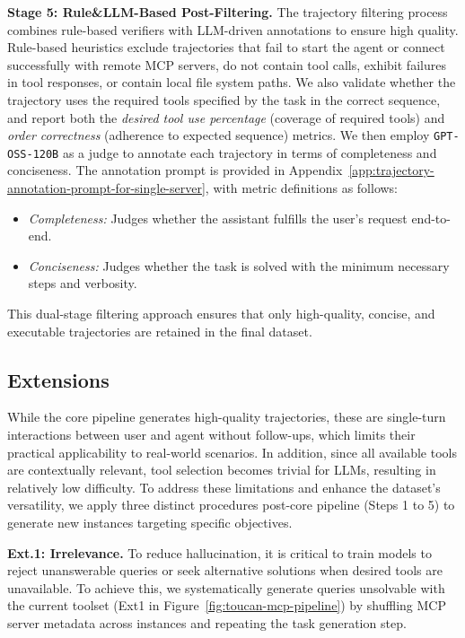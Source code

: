\textbf{\textcolor{orange!90!black}{Stage 5: Rule\&LLM-Based Post-Filtering.}}
The trajectory filtering process combines rule-based verifiers with LLM-driven annotations to ensure high quality. Rule-based heuristics exclude trajectories that fail to start the agent or connect successfully with remote MCP servers, do not contain tool calls, exhibit failures in tool responses, or contain local file system paths. We also validate whether the trajectory uses the required tools specified by the task in the correct sequence, and report both the \textit{desired tool use percentage} (coverage of required tools) and \textit{order correctness} (adherence to expected sequence) metrics. We then employ \texttt{GPT-OSS-120B} as a judge to annotate each trajectory in terms of completeness and conciseness. The annotation prompt is provided in Appendix~\ref{app:trajectory-annotation-prompt-for-single-server}, with metric definitions as follows:
\begin{itemize}[itemsep=0pt, parsep=0pt, topsep=0pt, leftmargin=1em]
\item \textit{Completeness:} Judges whether the assistant fulfills the user's request end-to-end.
\item \textit{Conciseness:} Judges whether the task is solved with the minimum necessary steps and verbosity.
\end{itemize}
This dual-stage filtering approach ensures that only high-quality, concise, and executable trajectories are retained in the final dataset.

\subsection{\dataname Extensions}\label{sec:toucan-extensions}

While the core pipeline generates high-quality trajectories, these are single-turn interactions between user and agent without follow-ups, which limits their practical applicability to real-world scenarios. In addition, since all available tools are contextually relevant, tool selection becomes trivial for LLMs, resulting in relatively low difficulty. To address these limitations and enhance the dataset's versatility, we apply three distinct procedures post-core pipeline (Steps 1 to 5) to generate new instances targeting specific objectives.

\textbf{\textcolor{blue!60!black}{Ext.1: Irrelevance.}} To reduce hallucination, it is critical to train models to reject unanswerable queries or seek alternative solutions when desired tools are unavailable. To achieve this, we systematically generate queries unsolvable with the current toolset (Ext1 in Figure~\ref{fig:toucan-mcp-pipeline}) by shuffling MCP server metadata across instances and repeating the task generation step.

